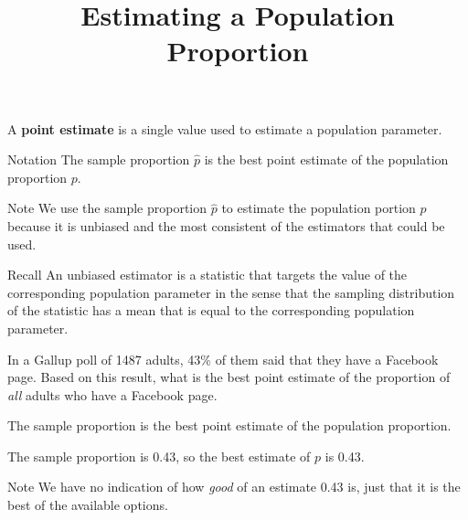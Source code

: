 \documentclass{beamer}
\title[MA205 - Section 6.1]{Estimating a Population Proportion}
\begin{document}
\begin{frame}
\titlepage
\end{frame}

\begin{frame}
\begin{definition}
A \textbf{point estimate} is a single value used to estimate a population parameter.
\end{definition}\pause

\begin{block}{Notation}
The sample proportion $\hat{p}$ is the best point estimate of the population proportion $p$.
\end{block}\pause

\begin{block}{Note}
We use the sample proportion $\hat{p}$ to estimate the population portion $p$ because it is unbiased and the most consistent of the estimators that could be used.
\end{block}\pause

\begin{block}{Recall}
An unbiased estimator is a statistic that targets the value of the corresponding population parameter in the sense that the sampling distribution of the statistic has a mean that is equal to the corresponding population parameter.
\end{block}
\end{frame}

\begin{frame}
\begin{example}
In a Gallup poll of 1487 adults, 43\% of them said that they have a Facebook page. Based on this result, what is the best point estimate of the proportion of \emph{all} adults who have a Facebook page.\pause

\vspace{2mm}
The sample proportion is the best point estimate of the population proportion.\pause

\vspace{2mm}
The sample proportion is 0.43, so the best estimate of $p$ is 0.43.
\end{example}\pause

\begin{block}{Note}
We have no indication of how \emph{good} of an estimate 0.43 is, just that it is the best of the available options.
\end{block}
\end{frame}
\end{document}
